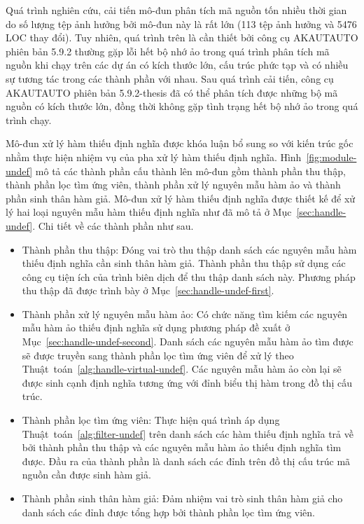 Quá trình nghiên cứu, cải tiến mô-đun phân tích mã nguồn tốn nhiều thời gian do số lượng tệp ảnh hưởng bởi mô-đun này là rất lớn (113 tệp ảnh hưởng và 5476 LOC thay đổi). Tuy nhiên, quá trình trên là cần thiết bởi công cụ AKAUTAUTO phiên bản 5.9.2 thường gặp lỗi hết bộ nhớ ảo trong quá trình phân tích mã nguồn khi chạy trên các dự án có kích thước lớn, cấu trúc phức tạp và có nhiều sự tương tác trong các thành phần với nhau. Sau quá trình cải tiến, công cụ AKAUTAUTO phiên bản 5.9.2-thesis đã có thể phân tích được những bộ mã nguồn có kích thước lớn, đồng thời không gặp tình trạng hết bộ nhớ ảo trong quá trình chạy.

Mô-đun xử lý hàm thiếu định nghĩa được khóa luận bổ sung so với kiến trúc gốc nhằm thực hiện nhiệm vụ của pha xử lý hàm thiếu định nghĩa. Hình~\ref{fig:module-undef} mô tả các thành phần cấu thành lên mô-đun gồm thành phần thu thập, thành phần lọc tìm ứng viên, thành phần xử lý nguyên mẫu hàm ảo và thành phần sinh thân hàm giả. Mô-đun xử lý hàm thiếu định nghĩa được thiết kế để xử lý hai loại nguyên mẫu hàm thiếu định nghĩa như đã mô tả ở Mục~\ref{sec:handle-undef}. Chi tiết về các thành phần như sau.
\begin{itemize}
    \item Thành phần thu thập: Đóng vai trò thu thập danh sách các nguyên mẫu hàm thiếu định nghĩa cần sinh thân hàm giả. Thành phần thu thập sử dụng các công cụ tiện ích của trình biên dịch để thu thập danh sách này. Phương pháp thu thập đã được trình bày ở Mục~\ref{sec:handle-undef-first}.
    \item Thành phần xử lý nguyên mẫu hàm ảo: Có chức năng tìm kiếm các nguyên mẫu hàm ảo thiếu định nghĩa sử dụng phương pháp đề xuất ở Mục~\ref{sec:handle-undef-second}. Danh sách các nguyên mẫu hàm ảo tìm được sẽ được truyền sang thành phần lọc tìm ứng viên để xử lý theo Thuật~toán~\ref{alg:handle-virtual-undef}. Các nguyên mẫu hàm ảo còn lại sẽ được sinh cạnh định nghĩa tương ứng với đỉnh biểu thị hàm trong đồ thị cấu trúc.
    \item Thành phần lọc tìm ứng viên: Thực hiện quá trình áp dụng Thuật~toán~\ref{alg:filter-undef} trên danh sách các hàm thiếu định nghĩa trả về bởi thành phần thu thập và các nguyên mẫu hàm ảo thiếu định nghĩa tìm được. Đầu ra của thành phần là danh sách các đỉnh trên đồ thị cấu trúc mã nguồn cần được sinh hàm giả. 
    \item Thành phần sinh thân hàm giả: Đảm nhiệm vai trò sinh thân hàm giả cho danh sách các đỉnh được tổng hợp bởi thành phần lọc tìm ứng viên.
\end{itemize}

